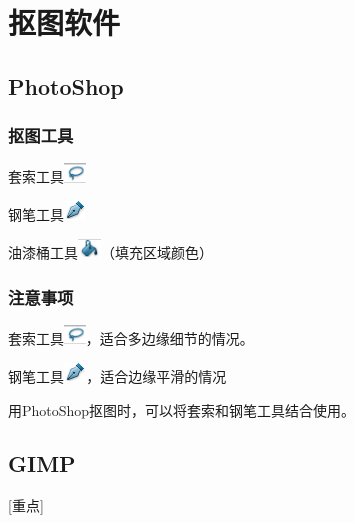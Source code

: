 \documentclass[12pt]{article}
\begin{document}
\section{抠图软件}
\subsection*{PhotoShop}
\subsubsection*{抠图工具}
\begin{itemize*}
\item 套索工具\includegraphics[height=0.2in]{taosuo.png}
\item 钢笔工具\includegraphics[height=0.2in]{gangbi.png}
\item 油漆桶工具\includegraphics[height=0.2in]{youqitong2.png}（填充区域颜色）
\end{itemize*}

\subsubsection*{注意事项}
\begin{itemize*}
\item 套索工具\includegraphics[height=0.2in]{taosuo.png}，适合多边缘细节的情况。
\item 钢笔工具\includegraphics[height=0.2in]{gangbi.png}，适合边缘平滑的情况
\item 用PhotoShop抠图时，可以将套索和钢笔工具结合使用。
\end{itemize*}


\subsection*{GIMP}[\textcolor{ZHY}{重点}]
\end{document}
